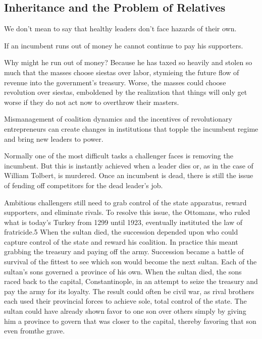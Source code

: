 \documentclass[10pt]{article}
\begin{document}
\subsection{Inheritance and the Problem of Relatives}

{\large We don't mean to say that healthy leaders don't face hazards of their
own.}

{\large If an incumbent runs out of money he cannot continue to pay his
supporters.}

{\large Why might he run out of money? Because he has taxed so heavily and
stolen so much that the masses choose siestas over labor, stymieing the future
flow of revenue into the government's treasury. Worse, the masses could choose
revolution over siestas, emboldened by the realization that things will only get
worse if they do not act now to overthrow their masters.}

{\large Mismanagement of coalition dynamics and the incentives of revolutionary
entrepreneurs can create changes in institutions that topple the incumbent regime
and bring new leaders to power.}

{\large Normally one of the most difficult tasks a challenger faces is removing
the incumbent. But this is instantly achieved when a leader dies or, as in the
case of William Tolbert, is murdered. Once an incumbent is dead, there is still
the issue of fending off competitors for the dead leader's job.}

{\large Ambitious challengers still need to grab control of the state apparatus,
reward supporters, and eliminate rivals. To resolve this issue, the Ottomans, who
ruled what is today's Turkey from 1299 until 1923, eventually instituted the law
of fratricide.5 When the sultan died, the succession depended upon who could
capture control of the state and reward his coalition. In practice this meant
grabbing the treasury and paying off the army. Succession became a battle of
survival of the fittest to see which son would become the next sultan. Each of
the sultan's sons governed a province of his own. When the sultan died, the sons
raced back to the capital, Constantinople, in an attempt to seize the treasury
and pay the army for its loyalty. The result could often be civil war, as rival
brothers each used their provincial forces to achieve sole, total control of the
state. The sultan could have already shown favor to one son over others simply by
giving him a province to govern that was closer to the capital, thereby favoring
that son even fromthe grave.}
\end{document}
